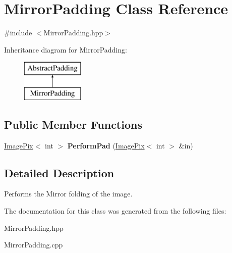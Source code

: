 \hypertarget{class_mirror_padding}{}\section{Mirror\+Padding Class Reference}
\label{class_mirror_padding}


{\ttfamily \#include $<$Mirror\+Padding.\+hpp$>$}

Inheritance diagram for Mirror\+Padding\+:\begin{figure}[H]
\begin{center}
\leavevmode
\includegraphics[height=2.000000cm]{class_mirror_padding}
\end{center}
\end{figure}
\subsection*{Public Member Functions}
\begin{DoxyCompactItemize}
\item 
\mbox{\label{class_mirror_padding_a61f965646b19bc7efe88ddf2e3825a75}} 
\hyperlink{class_image_pix}{Image\+Pix}$<$ int $>$ {\bfseries Perform\+Pad} (\hyperlink{class_image_pix}{Image\+Pix}$<$ int $>$ \&in)
\end{DoxyCompactItemize}


\subsection{Detailed Description}
Performs the Mirror folding of the image. 

The documentation for this class was generated from the following files\+:\begin{DoxyCompactItemize}
\item 
Mirror\+Padding.\+hpp\item 
Mirror\+Padding.\+cpp\end{DoxyCompactItemize}
